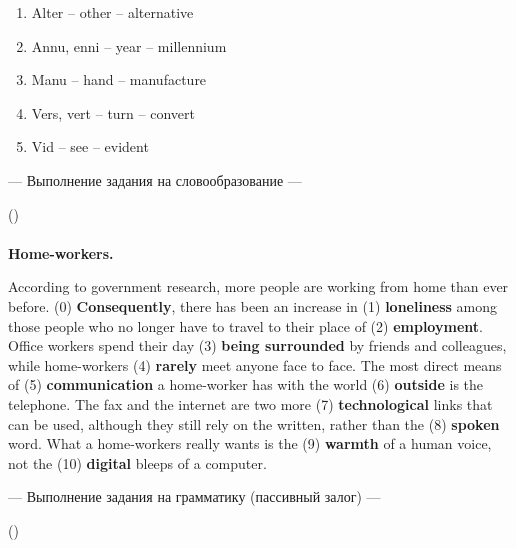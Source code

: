 \documentclass[main.tex]{subfiles}
\begin{document}

\begin{enumerate}[nosep]
	\itemsep\eitsp
	\item Alter -- other -- alternative
	\item Annu, enni -- year -- millennium
	\item Manu -- hand -- manufacture
	\item Vers, vert -- turn -- convert
	\item Vid -- see -- evident
\end{enumerate}

\newpage
{}

\hypertarget{ltask:2024-01-31-2}{--- Выполнение задания на словообразование ---} (\hyperref[task:2024-01-31-2]{\color{blue}{перейти к тексту задания}})
\\

\\

\textbf{Home-workers.}

According to government research, more people are working from home than ever before.
(0) \textbf{Consequently}, there has been an increase in (1) \textbf{loneliness} among those people who no longer have to travel to their place of (2) \textbf{employment}.
Office workers spend their day (3) \textbf{being surrounded} by friends and colleagues, while home-workers (4) \textbf{rarely} meet anyone face to face.
The most direct means of (5) \textbf{communication} a home-worker has with the world (6) \textbf{outside} is the telephone.
The fax and the internet are two more (7) \textbf{technological} links that can be used, although they still rely on the written, rather than the (8) \textbf{spoken} word.
What a home-workers really wants is the (9) \textbf{warmth} of a human voice, not the (10) \textbf{digital} bleeps of a computer.
\\

\newpage
{}

\hypertarget{ltask:2024-01-31-3}{--- Выполнение задания на грамматику (пассивный залог) ---} (\hyperref[task:2024-01-31-3]{\color{blue}{перейти к тексту задания}})
\\
\end{document}
